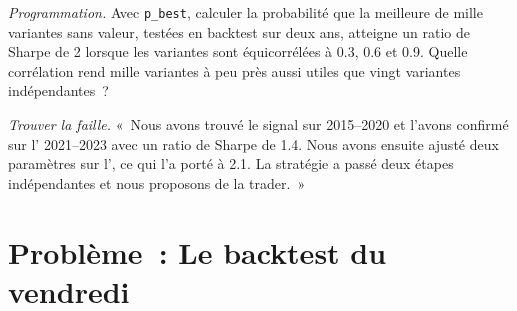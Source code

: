 \begin{exercise}[$\star\star\star$]\label{exo:rs:the-research-process:7}
\emph{Programmation.} Avec \texttt{p\_best}, calculer la probabilité que la meilleure de mille variantes sans valeur, testées en backtest sur deux
ans, atteigne un ratio de Sharpe de 2 lorsque les variantes sont équicorrélées à 0.3, 0.6 et 0.9. Quelle corrélation rend mille
variantes à peu près aussi utiles que vingt variantes indépendantes~?
\end{exercise}

\begin{exercise}[$\star\star\star$]\label{exo:rs:the-research-process:8}
\emph{Trouver la faille.} «~Nous avons trouvé le signal sur 2015--2020 et l'avons confirmé sur l' 2021--2023 avec un ratio de Sharpe de 1.4.
Nous avons ensuite ajusté deux paramètres sur l', ce qui l'a porté à 2.1. La stratégie a passé deux étapes indépendantes et nous
proposons de la trader.~»
\end{exercise}

\section{Problème~: Le backtest du vendredi}

